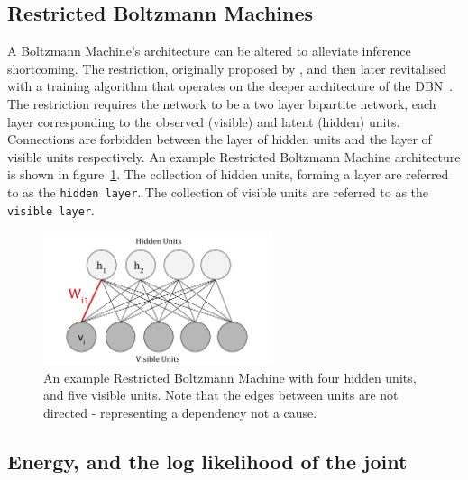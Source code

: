 \subsection{Restricted Boltzmann Machines}


A Boltzmann Machine's architecture can be altered to alleviate inference shortcoming. The restriction, originally proposed by \cite{Smolensky:1986vy}, and then later revitalised with a training algorithm that operates on the deeper architecture of the DBN~\cite{geoffreye.hintonterrencej.sejnowski1983}. The restriction requires the network to be a two layer bipartite network, each layer corresponding to the observed (visible) and latent (hidden) units. Connections are forbidden between the layer of hidden units and the layer of visible units respectively. An example Restricted Boltzmann Machine architecture is shown in figure~\ref{F:Restricted-Boltzmann-Machine}. The collection of hidden units, forming a layer are referred to as the \texttt{hidden layer}. The collection of visible units are referred to as the \texttt{visible layer}.

\begin{figure}[h]
\begin{center}
  \includegraphics[width = 0.6\textwidth]{Assets/RBM_Example.png}
\caption{An example Restricted Boltzmann Machine with four hidden units, and five visible units. Note that the edges between units are not directed - representing a dependency not a cause. }
\label{F:Restricted-Boltzmann-Machine}
\end{center}
\end{figure}

\subsection{Energy, and the log likelihood of the joint}

